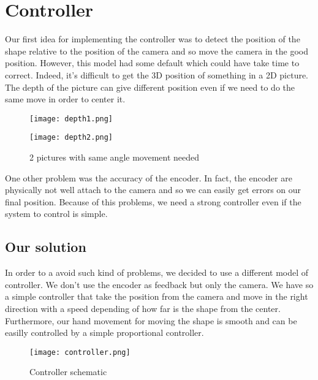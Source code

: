 \newpage
\section{Controller} \label{controller}
Our first idea for implementing the controller was to detect the position of the shape relative to the position of the camera and so move the camera in the good position. However, this model had some default which could have take time to correct. Indeed, it's  difficult to get the 3D position of something in a 2D picture. The depth of the picture can give different position even if we need to do the same move in order to center it.

\begin{figure}[!ht]
 \begin{minipage}{0.49\textwidth} %
\begin{center}
 \texttt{[image: depth1.png]}
    \label{titiecrase}
\end{center}
 \end{minipage}
 \begin{minipage}{0.49\textwidth}
 \begin{center}
    \texttt{[image: depth2.png]}
    \label{bochateau}
 \end{center}
 \end{minipage}
\caption{2 pictures with same angle movement needed}
\end{figure}

One other problem was the accuracy of the encoder. In fact, the encoder are physically not well attach to the camera and so we can easily get errors on our final position. Because of this problems, we need a strong controller even if the system to control is simple.

\subsection{Our solution}
In order to a avoid such kind of problems, we decided to use a different model of controller. We don't use the encoder as feedback but only the camera. We have so a simple controller that take the position from the camera and move in the right direction with a speed depending of how far is the shape from the center. Furthermore, our hand movement for moving the shape is smooth and can be easilly controlled by a simple proportional controller.

\begin{figure}[!ht]
\centering
 \texttt{[image: controller.png]}
 \caption{Controller schematic}
 \label{contr_sche}
\end{figure}

